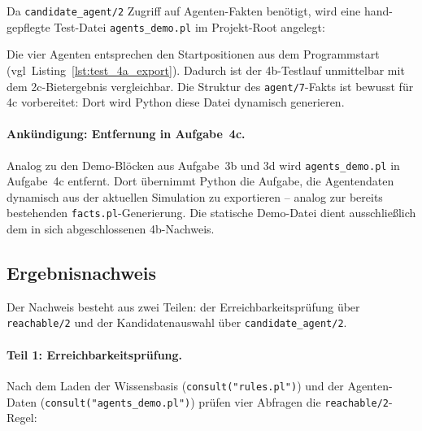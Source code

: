 Da \texttt{candidate\_agent/2} Zugriff auf Agenten-Fakten benötigt, wird eine hand-gepflegte Test-Datei \texttt{agents\_demo.pl} im Projekt-Root angelegt:



Die vier Agenten entsprechen den Startpositionen aus dem Programmstart (vgl\ Listing~\ref{lst:test_4a_export}). Dadurch ist der 4b-Testlauf unmittelbar mit dem 2c-Bietergebnis vergleichbar. Die Struktur des \texttt{agent/7}-Fakts ist bewusst für 4c vorbereitet: Dort wird Python diese Datei dynamisch generieren.

\paragraph{Ankündigung: Entfernung in Aufgabe~4c.}
Analog zu den Demo-Blöcken aus Aufgabe~3b und 3d wird \texttt{agents\_demo.pl} in Aufgabe~4c entfernt. Dort übernimmt Python die Aufgabe, die Agentendaten dynamisch aus der aktuellen Simulation zu exportieren -- analog zur bereits bestehenden \texttt{facts.pl}-Generierung. Die statische Demo-Datei dient ausschließlich dem in sich abgeschlossenen 4b-Nachweis.


\subsection{Ergebnisnachweis}
\label{sssec:prolog_4b_nachweis}

Der Nachweis besteht aus zwei Teilen: der Erreichbarkeitsprüfung über \texttt{reachable/2} und der Kandidatenauswahl über \texttt{candidate\_agent/2}.

\paragraph{Teil 1: Erreichbarkeitsprüfung.}
Nach dem Laden der Wissensbasis (\texttt{consult("rules.pl")}) und der Agenten-Daten (\texttt{consult("agents\_demo.pl")}) prüfen vier Abfragen die \texttt{reachable/2}-Regel:




